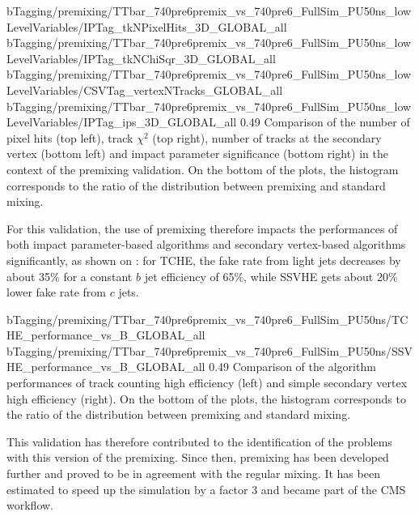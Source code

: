                       {bTagging/premixing/TTbar_740pre6premix_vs_740pre6_FullSim_PU50ns_lowLevelVariables/IPTag_tkNPixelHits_3D_GLOBAL_all}
                      {bTagging/premixing/TTbar_740pre6premix_vs_740pre6_FullSim_PU50ns_lowLevelVariables/IPTag_tkNChiSqr_3D_GLOBAL_all}
                      {bTagging/premixing/TTbar_740pre6premix_vs_740pre6_FullSim_PU50ns_lowLevelVariables/CSVTag_vertexNTracks_GLOBAL_all}
                      {bTagging/premixing/TTbar_740pre6premix_vs_740pre6_FullSim_PU50ns_lowLevelVariables/IPTag_ips_3D_GLOBAL_all}
                      {0.49}
                      {Comparison of the number of pixel hits (top left), track $\chi^2$
                      (top right), number of tracks at the secondary vertex (bottom left) and
                      impact parameter significance (bottom right) in the context
                      of the premixing validation. On the bottom of the plots, the histogram corresponds
                      to the ratio of the distribution between premixing and standard mixing. }

    For this validation, the use of premixing therefore impacts the performances of both
    impact parameter-based algorithms and  secondary vertex-based algorithms significantly,
    as shown on : for TCHE, the fake rate from light jets
    decreases by about 35\% for a constant $b$ jet efficiency of 65\%, while SSVHE gets about 20\%
    lower fake rate from $c$ jets.

                     {bTagging/premixing/TTbar_740pre6premix_vs_740pre6_FullSim_PU50ns/TCHE_performance_vs_B_GLOBAL_all}
                     {bTagging/premixing/TTbar_740pre6premix_vs_740pre6_FullSim_PU50ns/SSVHE_performance_vs_B_GLOBAL_all}
                     {0.49}
                     {Comparison of the algorithm performances of track counting high
                      efficiency (left) and simple secondary vertex high efficiency (right).
                      On the bottom of the plots, the histogram corresponds
                      to the ratio of the distribution between premixing and standard mixing. }

    This validation has therefore contributed to the identification of the problems with
    this version of the premixing. Since then, premixing has been developed further and
    proved to be in agreement with the regular mixing. It has been estimated to speed up the
    simulation by a factor 3 \cite{Premixing} and became part of the CMS workflow.

